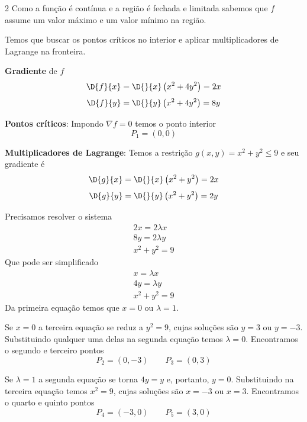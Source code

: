 \documentclass[a4paper,12pt,fleqn]{article}
\begin{document}
\begin{answer}
  \setlength\columnsep{3em}
  \setlength{\jot}{5pt}
  \begin{multicols}{2}
    \raggedcolumns
    Como a função é contínua e a região é fechada e limitada sabemos que
    $f$ assume um valor máximo e um valor mínimo na região.

    \vspace{\baselineskip}
    Temos que buscar os pontos críticos no interior e aplicar multiplicadores
    de Lagrange na fronteira.

    \vspace{\baselineskip}
    \textbf{Gradiente} de $f$
    \[
      \D{f}{x}
      = \D{}{x}\left(x^2 + 4y^2\right)
      = 2x
    \]
    \[
      \D{f}{y}
      = \D{}{y}\left(x^2 + 4y^2\right)
      = 8y
    \]

    \vspace{\baselineskip}
    \textbf{Pontos críticos}:
    Impondo \(\nabla f = 0\) temos o ponto interior
    \[
      P_1 = (0, 0)
    \]

    \vspace{\baselineskip}
    \textbf{Multiplicadores de Lagrange}:
    Temos a restrição \(g(x, y) = x^2 + y^2 \leq 9\) e seu gradiente é
    \[
      \D{g}{x}
      = \D{}{x}\left(x^2 + y^2\right)
      = 2x
    \]
    \[
      \D{g}{y}
      = \D{}{y}\left(x^2 + y^2\right)
      = 2y
    \]

    Precisamos resolver o sistema
    \begin{gather*}
      2x = 2\lambda x \\
      8y = 2\lambda y \\
      x^2 + y^2 = 9
    \end{gather*}
    Que pode ser simplificado
    \begin{gather*}
      x = \lambda x \\
      4y = \lambda y \\
      x^2 + y^2 = 9
    \end{gather*}
    Da primeira equação temos que $x=0$ ou $\lambda=1$.

    Se $x=0$ a terceira equação se reduz a $y^2=9$, cujas soluções são
    $y=3$ ou $y=-3$. Substituindo qualquer uma delas na segunda equação
    temos $\lambda = 0$. Encontramos o segundo e terceiro pontos
    \[
      P_2 = (0, -3)
      \qquad
      P_3 = (0, 3)
    \]

    Se $\lambda=1$ a segunda equação se torna $4y=y$ e, portanto, $y=0$.
    Substituindo na terceira equação temos $x^2=9$, cujas soluções são
    $x=-3$ ou $x=3$.  Encontramos o quarto e quinto pontos
    \[
      P_4 = (-3, 0)
      \qquad
      P_5 = (3, 0)
    \]


\end{multicols}
\end{answer}
\end{document}

